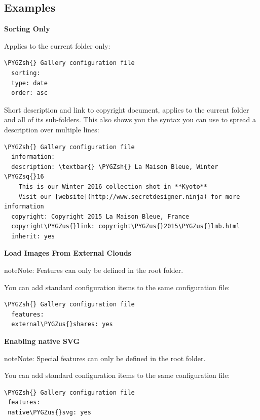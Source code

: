 \documentclass[letterpaper,10pt,english]{sphinxmanual}
\def\PYGZus{\char`\_}
\def\PYGZsh{\char`\#}
\def\PYGZsq{\char`\'}
\begin{document}
\subsection{Examples}
\label{files/gallery_app:examples}
\textbf{Sorting Only}

Applies to the current folder only:

\begin{Verbatim}[commandchars=\\\{\}]
\PYGZsh{} Gallery configuration file
  sorting:
  type: date
  order: asc
\end{Verbatim}

Short description and link to copyright document, applies to the current folder
and all of its sub-folders. This also shows you the syntax you can use to
spread a description over multiple lines:

\begin{Verbatim}[commandchars=\\\{\}]
\PYGZsh{} Gallery configuration file
  information:
  description: \textbar{} \PYGZsh{} La Maison Bleue, Winter \PYGZsq{}16
    This is our Winter 2016 collection shot in **Kyoto**
    Visit our [website](http://www.secretdesigner.ninja) for more information
  copyright: Copyright 2015 La Maison Bleue, France
  copyright\PYGZus{}link: copyright\PYGZus{}2015\PYGZus{}lmb.html
  inherit: yes
\end{Verbatim}

\textbf{Load Images From External Clouds}

\begin{notice}{note}{Note:}
Features can only be defined in the root folder.
\end{notice}

You can add standard configuration items to the same configuration file:

\begin{Verbatim}[commandchars=\\\{\}]
\PYGZsh{} Gallery configuration file
  features:
  external\PYGZus{}shares: yes
\end{Verbatim}

\textbf{Enabling native SVG}

\begin{notice}{note}{Note:}
Special features can only be defined in the root folder.
\end{notice}

You can add standard configuration items to the same configuration file:

\begin{Verbatim}[commandchars=\\\{\}]
\PYGZsh{} Gallery configuration file
 features:
 native\PYGZus{}svg: yes
\end{Verbatim}
\end{document}
